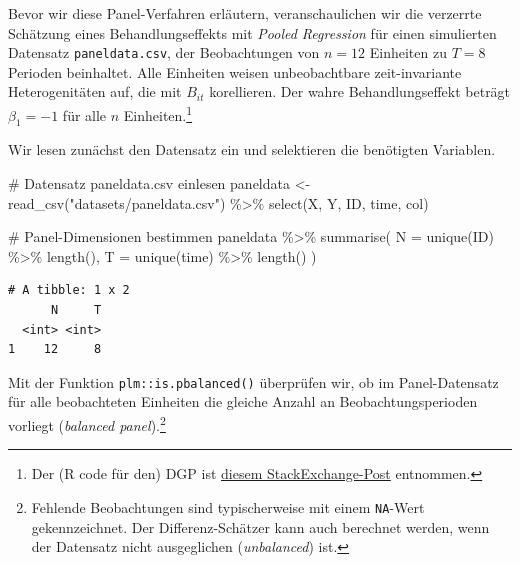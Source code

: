 \documentclass[
  a4paper,
  DIV=11,
  oneside]{scrreprt}
\newenvironment{Shaded}{\begin{snugshade}}{\end{snugshade}}
\newcommand{\AttributeTok}[1]{\textcolor[rgb]{0.40,0.45,0.13}{#1}}
\newcommand{\CommentTok}[1]{\textcolor[rgb]{0.37,0.37,0.37}{#1}}
\newcommand{\FunctionTok}[1]{\textcolor[rgb]{0.28,0.35,0.67}{#1}}
\newcommand{\NormalTok}[1]{\textcolor[rgb]{0.00,0.23,0.31}{#1}}
\newcommand{\OtherTok}[1]{\textcolor[rgb]{0.00,0.23,0.31}{#1}}
\newcommand{\SpecialCharTok}[1]{\textcolor[rgb]{0.37,0.37,0.37}{#1}}
\newcommand{\StringTok}[1]{\textcolor[rgb]{0.13,0.47,0.30}{#1}}
\begin{document}
Bevor wir diese Panel-Verfahren erläutern, veranschaulichen wir die
verzerrte Schätzung eines Behandlungseffekts mit \emph{Pooled
Regression} für einen simulierten Datensatz \texttt{paneldata.csv}, der
Beobachtungen von \(n=12\) Einheiten zu \(T=8\) Perioden beinhaltet.
Alle Einheiten weisen unbeobachtbare zeit-invariante Heterogenitäten
auf, die mit \(B_{it}\) korellieren. Der wahre Behandlungseffekt beträgt
\(\beta_1 = -1\) für alle \(n\) Einheiten.\footnote{Der (R code für den)
  DGP ist \href{https://stats.stackexchange.com/a/188559}{diesem
  StackExchange-Post} entnommen.}

Wir lesen zunächst den Datensatz ein und selektieren die benötigten
Variablen.

\begin{Shaded}
\begin{Highlighting}[]
\CommentTok{\# Datensatz \textquotesingle{}paneldata.csv\textquotesingle{} einlesen}
\NormalTok{paneldata }\OtherTok{\textless{}{-}} \FunctionTok{read\_csv}\NormalTok{(}\StringTok{"datasets/paneldata.csv"}\NormalTok{) }\SpecialCharTok{\%\textgreater{}\%} 
  \FunctionTok{select}\NormalTok{(X, Y, ID, time, col)}
\end{Highlighting}
\end{Shaded}

\begin{Shaded}
\begin{Highlighting}[]
\CommentTok{\# Panel{-}Dimensionen bestimmen}
\NormalTok{paneldata }\SpecialCharTok{\%\textgreater{}\%}
  \FunctionTok{summarise}\NormalTok{(}
    \AttributeTok{N =} \FunctionTok{unique}\NormalTok{(ID) }\SpecialCharTok{\%\textgreater{}\%} \FunctionTok{length}\NormalTok{(),}
    \AttributeTok{T =} \FunctionTok{unique}\NormalTok{(time) }\SpecialCharTok{\%\textgreater{}\%} \FunctionTok{length}\NormalTok{()}
\NormalTok{  )}
\end{Highlighting}
\end{Shaded}

\begin{verbatim}
# A tibble: 1 x 2
      N     T
  <int> <int>
1    12     8
\end{verbatim}

Mit der Funktion \texttt{plm::is.pbalanced()} überprüfen wir, ob im
Panel-Datensatz für alle beobachteten Einheiten die gleiche Anzahl an
Beobachtungsperioden vorliegt (\emph{balanced panel}).\footnote{Fehlende
  Beobachtungen sind typischerweise mit einem \texttt{NA}-Wert
  gekennzeichnet. Der Differenz-Schätzer kann auch berechnet werden,
  wenn der Datensatz nicht ausgeglichen (\emph{unbalanced}) ist.}
\end{document}
